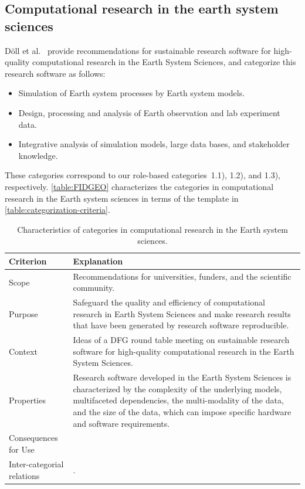 \documentclass{IEEEcsmag}
\newcommand{\ieeeitem}{\item[{\ieeeguilsinglright}]}
\begin{document}
\subsection{Computational research in the earth system sciences}

D\"oll et al.~\cite{FIDGEO2023} provide recommendations for sustainable research software for high-quality computational research in the Earth System Sciences, and categorize this research software as follows:
\begin{itemize}
    \ieeeitem Simulation of Earth system processes by Earth system models.
    \ieeeitem Design, processing and analysis of Earth observation and lab experiment data.
	  \ieeeitem Integrative analysis of simulation models, large data bases, and stakeholder knowledge.
\end{itemize}
These categories correspond to our role-based categories~1.1), 1.2), and 1.3), respectively.
\autoref{table:FIDGEO} characterizes the categories in computational research in the Earth system sciences in terms of the template in \autoref{table:categorization-criteria}.

\begin{table}[bt]
    \centering
    \begin{tabularx}{\textwidth}{l X}
    \toprule
        Criterion & Explanation \\
    \midrule
        Scope & Recommendations for universities, funders, and the scientific community. \\
        Purpose & Safeguard the quality and efficiency of computational research in Earth System Sciences and make research results that have been generated by research software reproducible.\\
        Context & Ideas of a DFG round table meeting on sustainable research software for high-quality computational research in the Earth System Sciences. \\
        Properties & Research software developed in the Earth System Sciences is characterized by the complexity of the underlying models, multifaceted dependencies, the multi-modality of the data, and the size of the data, which can impose specific hardware and software requirements.\\
        Consequences for Use & \\
        Inter-categorial relations & .\\
    \bottomrule
    \end{tabularx}
    \caption{Characteristics of categories in computational research in the Earth system sciences.}
    \label{table:FIDGEO}
\end{table}
\end{document}

